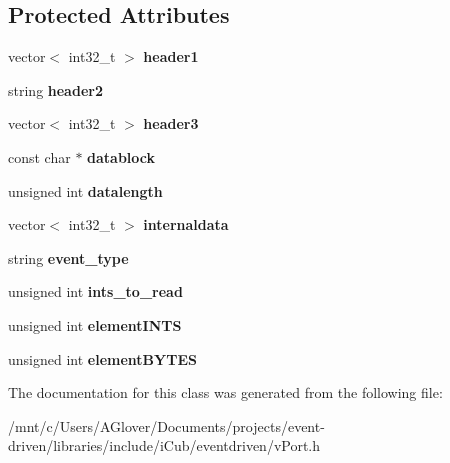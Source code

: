 \subsection*{Protected Attributes}
\begin{DoxyCompactItemize}
\item 
\mbox{\label{classev_1_1vPortableInterface_aa6963fbd9f86d0c12b1cec3f50154039}} 
vector$<$ int32\+\_\+t $>$ {\bfseries header1}
\item 
\mbox{\label{classev_1_1vPortableInterface_aacd6a1f6ca7e75d8b56fb00bdab93115}} 
string {\bfseries header2}
\item 
\mbox{\label{classev_1_1vPortableInterface_a4c8644690c45885728ccded09831b907}} 
vector$<$ int32\+\_\+t $>$ {\bfseries header3}
\item 
\mbox{\label{classev_1_1vPortableInterface_a4e3377c27147a1dd9364a9c01a9433a3}} 
const char $\ast$ {\bfseries datablock}
\item 
\mbox{\label{classev_1_1vPortableInterface_afb56f5c3c78e2029796cc8e3633c7fb1}} 
unsigned int {\bfseries datalength}
\item 
\mbox{\label{classev_1_1vPortableInterface_ae8efe8cb3e40fc651d359073e6f53396}} 
vector$<$ int32\+\_\+t $>$ {\bfseries internaldata}
\item 
\mbox{\label{classev_1_1vPortableInterface_a74417dedd31327a04fcb03f9c5362651}} 
string {\bfseries event\+\_\+type}
\item 
\mbox{\label{classev_1_1vPortableInterface_a9f1790f33d34109839ad9845dffb6e77}} 
unsigned int {\bfseries ints\+\_\+to\+\_\+read}
\item 
\mbox{\label{classev_1_1vPortableInterface_a66759f62e93cdb2e6b82595f486de0ca}} 
unsigned int {\bfseries element\+I\+N\+TS}
\item 
\mbox{\label{classev_1_1vPortableInterface_a1aff2a4a19957a3d28c9981506f65128}} 
unsigned int {\bfseries element\+B\+Y\+T\+ES}
\end{DoxyCompactItemize}


The documentation for this class was generated from the following file\+:\begin{DoxyCompactItemize}
\item 
/mnt/c/\+Users/\+A\+Glover/\+Documents/projects/event-\/driven/libraries/include/i\+Cub/eventdriven/v\+Port.\+h\end{DoxyCompactItemize}
